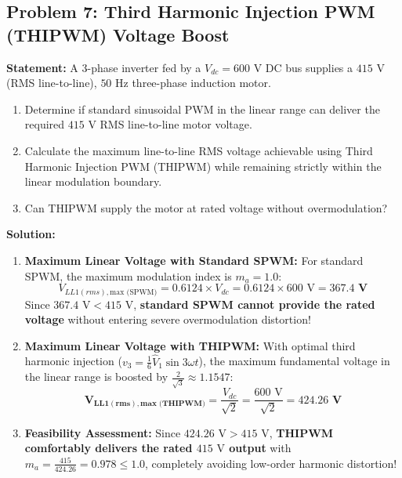 \documentclass[11pt,a4paper]{article}
\begin{document}
\subsection{Problem 7: Third Harmonic Injection PWM (THIPWM) Voltage Boost}
\begin{examplebox}
\textbf{Statement:} A 3-phase inverter fed by a $V_{dc} = 600\text{ V}$ DC bus supplies a $415\text{ V}$ (RMS line-to-line), $50\text{ Hz}$ three-phase induction motor.
\begin{enumerate}
  \item Determine if standard sinusoidal PWM in the linear range can deliver the required $415\text{ V}$ RMS line-to-line motor voltage.
  \item Calculate the maximum line-to-line RMS voltage achievable using Third Harmonic Injection PWM (THIPWM) while remaining strictly within the linear modulation boundary.
  \item Can THIPWM supply the motor at rated voltage without overmodulation?
\end{enumerate}

\tcblower
\textbf{Solution:}
\begin{enumerate}
  \item \textbf{Maximum Linear Voltage with Standard SPWM:}
  For standard SPWM, the maximum modulation index is $m_a = 1.0$:
  \begin{equation*}
  V_{LL1(rms),\text{max (SPWM)}} = 0.6124 \times V_{dc} = 0.6124 \times 600\text{ V} = \mathbf{367.4\text{ V}}
  \end{equation*}
  Since $367.4\text{ V} < 415\text{ V}$, \textbf{standard SPWM cannot provide the rated voltage} without entering severe overmodulation distortion!

  \item \textbf{Maximum Linear Voltage with THIPWM:}
  With optimal third harmonic injection ($v_3 = \frac{1}{6}\hat{V}_1 \sin 3\omega t$), the maximum fundamental voltage in the linear range is boosted by $\frac{2}{\sqrt{3}} \approx 1.1547$:
  \begin{equation*}
  \mathbf{V_{LL1(rms),\text{max (THIPWM)}}} = \frac{V_{dc}}{\sqrt{2}} = \frac{600\text{ V}}{\sqrt{2}} = \mathbf{424.26\text{ V}}
  \end{equation*}

  \item \textbf{Feasibility Assessment:}
  Since $424.26\text{ V} > 415\text{ V}$, \textbf{THIPWM comfortably delivers the rated $415\text{ V}$ output} with $m_a = \frac{415}{424.26} = 0.978 \le 1.0$, completely avoiding low-order harmonic distortion!
\end{enumerate}
\end{examplebox}
\end{document}
